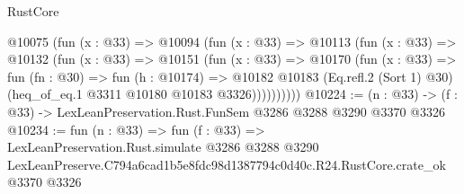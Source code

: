 \begin{lexlean}{RustCore}
\begin{coremodule}
        @10075
          (fun (x : @33) =>
          @10094
            (fun (x : @33) =>
            @10113
              (fun (x : @33) =>
              @10132
                (fun (x : @33) =>
                @10151
                  (fun (x : @33) =>
                  @10170
                    (fun (x : @33) =>
                    fun (fn : @30) =>
                    fun (h : @10174) =>
                    @10182
                      @10183
                      (Eq.refl.{2} (Sort 1) @30)
                      (heq_of_eq.{1} @3311 @10180 @10183 @3326))))))))))
@10224 := (n : @33) -> (f : @33) -> LexLeanPreservation.Rust.FunSem @3286 @3288 @3290 @3370 @3326
@10234 := fun (n : @33) =>
  fun (f : @33) =>
  LexLeanPreservation.Rust.simulate
    @3286
    @3288
    @3290
    LexLeanPreserve.C794a6cad1b5e8fdc98d1387794c0d40c.R24.RustCore.crate_ok
    @3370
    @3326
\end{coremodule}
\end{lexlean}
